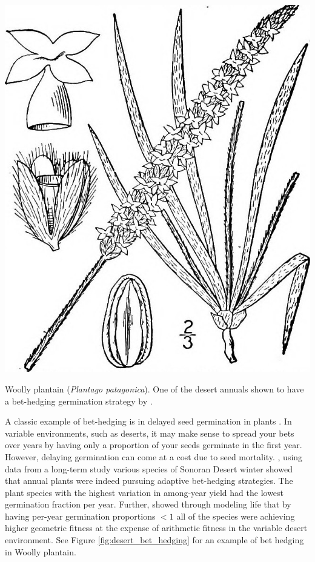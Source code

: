   \begin{marginfigure}
\begin{center}
\includegraphics[width= \textwidth]{illustration_images/single_locus_selection/woolly_plantain/20771670485_fb7e476748_b.jpg}
\end{center}
\caption{Woolly plantain ({\it Plantago patagonica}). One of the
  desert annuals shown to have a bet-hedging germination strategy by
  \citet{gremer2014bet}. } \label{fig:Woolly_plantain}
\end{marginfigure}

A classic example of bet-hedging is in delayed seed germination in
plants \citep{cohen1966optimizing}. In variable environments, such as
deserts, it may make sense to spread your bets over years by having
only a proportion of your seeds germinate in the first year. However,
delaying germination can come at a cost due to seed
mortality. \citet{gremer2014bet}, using data from a long-term study
various species of Sonoran Desert winter showed that annual plants
were indeed pursuing adaptive bet-hedging strategies.
The plant species with the highest variation in among-year yield had
the lowest germination fraction per year.  Further,
\citeauthor{gremer2014bet} showed through modeling life that by having
per-year germination proportions $<1$ all of the species were
achieving higher geometric fitness at the expense of arithmetic
fitness in the variable desert environment. See Figure
\ref{fig:desert_bet_hedging} for an example of bet hedging in Woolly plantain.

